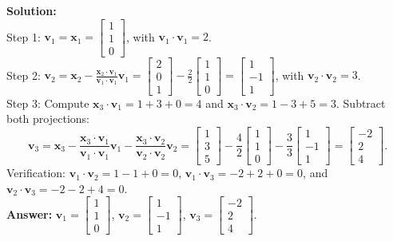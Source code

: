 \documentclass[11pt, letterpaper]{article}
\theoremstyle{definition}
\theoremstyle{remark}
\begin{document}
\textbf{Solution:} \\
Step 1: $\mathbf{v}_1 = \mathbf{x}_1 = \begin{bmatrix} 1 \\ 1 \\ 0 \end{bmatrix}$, with $\mathbf{v}_1 \cdot \mathbf{v}_1 = 2$. \\
Step 2: $\mathbf{v}_2 = \mathbf{x}_2 - \frac{\mathbf{x}_2 \cdot \mathbf{v}_1}{\mathbf{v}_1 \cdot \mathbf{v}_1}\mathbf{v}_1 = \begin{bmatrix} 2 \\ 0 \\ 1 \end{bmatrix} - \frac{2}{2}\begin{bmatrix} 1 \\ 1 \\ 0 \end{bmatrix} = \begin{bmatrix} 1 \\ -1 \\ 1 \end{bmatrix}$, with $\mathbf{v}_2 \cdot \mathbf{v}_2 = 3$. \\
Step 3: Compute $\mathbf{x}_3 \cdot \mathbf{v}_1 = 1 + 3 + 0 = 4$ and $\mathbf{x}_3 \cdot \mathbf{v}_2 = 1 - 3 + 5 = 3$. Subtract both projections:
\[
\mathbf{v}_3 = \mathbf{x}_3 - \frac{\mathbf{x}_3 \cdot \mathbf{v}_1}{\mathbf{v}_1 \cdot \mathbf{v}_1}\mathbf{v}_1 - \frac{\mathbf{x}_3 \cdot \mathbf{v}_2}{\mathbf{v}_2 \cdot \mathbf{v}_2}\mathbf{v}_2 = \begin{bmatrix} 1 \\ 3 \\ 5 \end{bmatrix} - \frac{4}{2}\begin{bmatrix} 1 \\ 1 \\ 0 \end{bmatrix} - \frac{3}{3}\begin{bmatrix} 1 \\ -1 \\ 1 \end{bmatrix} = \begin{bmatrix} -2 \\ 2 \\ 4 \end{bmatrix}.
\]
Verification: $\mathbf{v}_1 \cdot \mathbf{v}_2 = 1 - 1 + 0 = 0$, $\mathbf{v}_1 \cdot \mathbf{v}_3 = -2 + 2 + 0 = 0$, and $\mathbf{v}_2 \cdot \mathbf{v}_3 = -2 - 2 + 4 = 0$. \\
\textbf{Answer:} $\mathbf{v}_1 = \begin{bmatrix} 1 \\ 1 \\ 0 \end{bmatrix}$, $\mathbf{v}_2 = \begin{bmatrix} 1 \\ -1 \\ 1 \end{bmatrix}$, $\mathbf{v}_3 = \begin{bmatrix} -2 \\ 2 \\ 4 \end{bmatrix}$.
\end{document}
